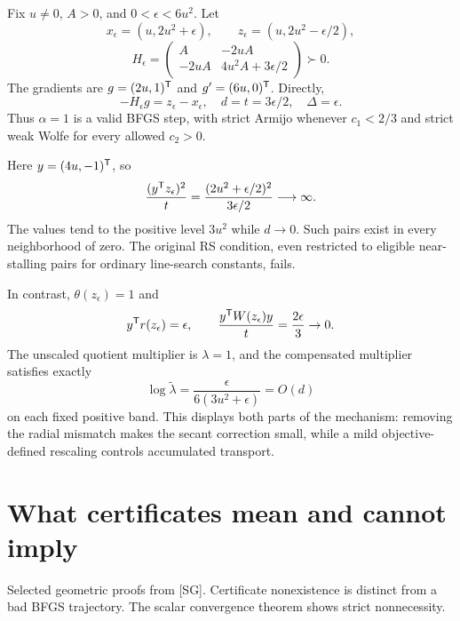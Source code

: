\documentclass[10pt,oneside,openany]{book}
\newcommand{\ModuleTag}{I}
\theoremstyle{remark}\newtheorem{remark}{Remark}[chapter]
\renewcommand{\thetheorem}{\ModuleTag.\arabic{theorem}}
\renewcommand{\thelemma}{\ModuleTag.\arabic{lemma}}
\renewcommand{\thecorollary}{\ModuleTag.\arabic{corollary}}
\renewcommand{\theproposition}{\ModuleTag.\arabic{proposition}}
\renewcommand{\theremark}{\ModuleTag.\arabic{remark}}
\newcommand{\StartModule}[3]{\cleardoublepage\renewcommand{\ModuleTag}{#1}\chapter{#2}\label{#1:chapter}\begin{small}\color{Accent}#3\end{small}\par\vspace{3pt}{\color{RuleGray}\hrule}\vspace{9pt}}
\begin{document}
Fix $u\ne0$, $A>0$, and $0<\epsilon<6u^2$. Let
\[
 x_\epsilon=(u,2u^2+\epsilon),\qquad
 z_\epsilon=(u,2u^2-\epsilon/2),
\]
\[
 H_\epsilon=
 \begin{pmatrix}
 A&-2uA\\-2uA&4u^2A+3\epsilon/2
 \end{pmatrix}\succ0.
\]
The gradients are $g=(2u,1)^{\mathsf T}$ and $g'=(6u,0)^{\mathsf T}$. Directly,
\[
 -H_\epsilon g=z_\epsilon-x_\epsilon,
 \quad d=t=3\epsilon/2,\quad \Delta=\epsilon.
\]
Thus $\alpha=1$ is a valid BFGS step, with strict Armijo whenever $c_1<2/3$ and strict weak Wolfe for every allowed $c_2>0$.

Here $y=(4u,-1)^{\mathsf T}$, so
\[
 \frac{(y^{\mathsf T} z_\epsilon)^2}{t}
 =\frac{(2u^2+\epsilon/2)^2}{3\epsilon/2}\longrightarrow\infty.
\]
The values tend to the positive level $3u^2$ while $d\to0$. Such pairs exist in every neighborhood of zero. The original RS condition, even restricted to eligible near-stalling pairs for ordinary line-search constants, fails.

In contrast, $\theta(z_\epsilon)=1$ and
\[
 y^{\mathsf T} r(z_\epsilon)=\epsilon,\qquad
 \frac{y^{\mathsf T} W(z_\epsilon)y}{t}=\frac{2\epsilon}{3}\to0.
\]
The unscaled quotient multiplier is $\lambda=1$, and the compensated multiplier satisfies exactly
\[
 \log\widetilde\lambda
 =\frac{\epsilon}{6(3u^2+\epsilon)}=O(d)
\]
on each fixed positive band. This displays both parts of the mechanism: removing the radial mismatch makes the secant correction small, while a mild objective-defined rescaling controls accumulated transport.


\endgroup


\StartModule{G}{What certificates mean and cannot imply}{Selected geometric proofs from [SG]. Certificate nonexistence is distinct from a bad BFGS trajectory. The scalar convergence theorem shows strict nonnecessity.}

\begingroup
\providecommand{\R}{}
\renewcommand{\R}{\mathbb R}
\providecommand{\PSD}{}
\renewcommand{\PSD}{\succeq0}
\providecommand{\range}{}
\renewcommand{\range}{\operatorname{range}}
\providecommand{\aff}{}
\renewcommand{\aff}{\operatorname{aff}}
\providecommand{\conv}{}
\renewcommand{\conv}{\operatorname{conv}}
\providecommand{\norm}{}
\renewcommand{\norm}[1]{\left\|#1\right\|}
\providecommand{\ip}{}
\renewcommand{\ip}[2]{\langle #1,#2\rangle}
\makeatletter\let\c@lemma\c@theorem\let\c@corollary\c@theorem\let\c@proposition\c@theorem\let\c@remark\c@theorem\makeatother
\renewcommand{\thelemma}{\thetheorem}\renewcommand{\thecorollary}{\thetheorem}\renewcommand{\theproposition}{\thetheorem}\renewcommand{\theremark}{\thetheorem}
\renewcommand{\thetheorem}{G.\arabic{section}.\arabic{theorem}}
\setcounter{section}{0}
\setcounter{theorem}{0}
\setcounter{equation}{0}
\end{document}
